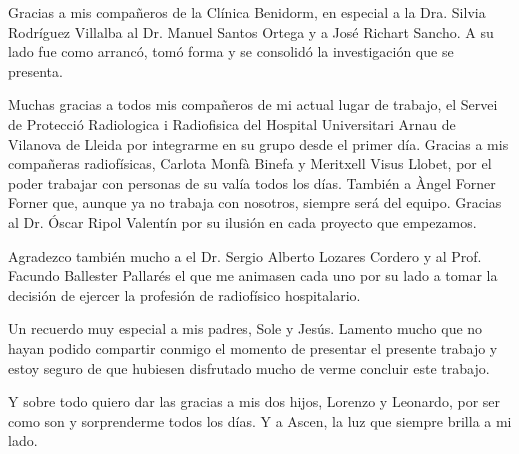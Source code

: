 Gracias a mis compañeros de la Clínica Benidorm, en especial a la Dra. Silvia Rodríguez Villalba al Dr. Manuel Santos Ortega y a José Richart Sancho. A su lado fue como arrancó, tomó forma y se consolidó la investigación que se presenta.

Muchas gracias a todos mis compañeros de mi actual lugar de trabajo, el Servei de Protecció Radiologica i Radiofisica del Hospital Universitari Arnau de Vilanova de Lleida por integrarme en su grupo desde el primer día. Gracias a mis compañeras radiofísicas, Carlota Monfà Binefa y Meritxell Visus Llobet, por el poder trabajar con personas de su valía todos los días. También a Àngel Forner Forner que, aunque ya no trabaja con nosotros, siempre será del equipo. Gracias al Dr. Óscar Ripol Valentín por su ilusión en cada proyecto que empezamos.

Agradezco también mucho a el Dr. Sergio Alberto Lozares Cordero y al Prof. Facundo Ballester Pallarés el que me animasen cada uno por su lado a tomar la decisión de ejercer la profesión de radiofísico hospitalario.

Un recuerdo muy especial a mis padres, Sole y Jesús. Lamento mucho que no hayan podido compartir conmigo el momento de presentar el presente trabajo y estoy seguro de que hubiesen disfrutado mucho de verme concluir este trabajo.

Y sobre todo quiero dar las gracias a mis dos hijos, Lorenzo y Leonardo, por ser como son y sorprenderme todos los días. Y a Ascen, la luz que siempre brilla a mi lado.

\newpage
\thispagestyle{empty}
\begin{flushright}
\end{flushright}